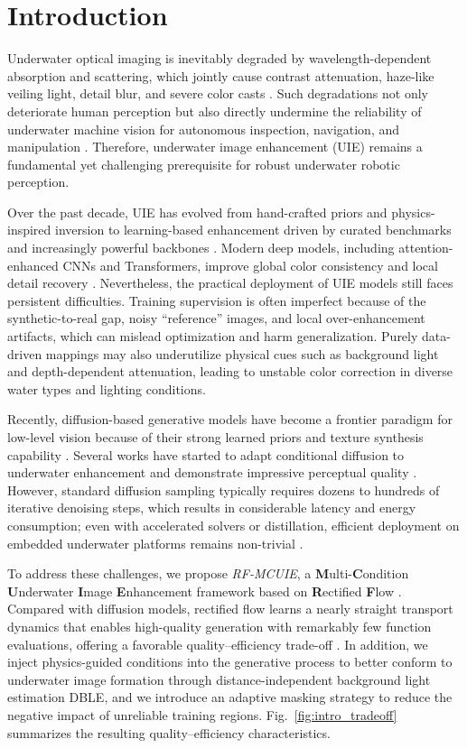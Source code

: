 \section{Introduction}
\label{sec:intro}

Underwater optical imaging is inevitably degraded by wavelength-dependent absorption and scattering, which jointly cause contrast attenuation, haze-like veiling light, detail blur, and severe color casts \cite{r1,r12}. Such degradations not only deteriorate human perception but also directly undermine the reliability of underwater machine vision for autonomous inspection, navigation, and manipulation \cite{r2,r3}. Therefore, underwater image enhancement (UIE) remains a fundamental yet challenging prerequisite for robust underwater robotic perception.

Over the past decade, UIE has evolved from hand-crafted priors and physics-inspired inversion \cite{r4,r14,r17} to learning-based enhancement driven by curated benchmarks and increasingly powerful backbones \cite{r18,r6}. Modern deep models, including attention-enhanced CNNs and Transformers, improve global color consistency and local detail recovery \cite{r0,r42,r7}. Nevertheless, the practical deployment of UIE models still faces persistent difficulties. Training supervision is often imperfect because of the synthetic-to-real gap, noisy ``reference'' images, and local over-enhancement artifacts, which can mislead optimization and harm generalization. Purely data-driven mappings may also underutilize physical cues such as background light and depth-dependent attenuation, leading to unstable color correction in diverse water types and lighting conditions.

Recently, diffusion-based generative models have become a frontier paradigm for low-level vision because of their strong learned priors and texture synthesis capability \cite{r20,r22}. Several works have started to adapt conditional diffusion to underwater enhancement and demonstrate impressive perceptual quality \cite{r9,r24,r8,r10}. However, standard diffusion sampling typically requires dozens to hundreds of iterative denoising steps, which results in considerable latency and energy consumption; even with accelerated solvers or distillation, efficient deployment on embedded underwater platforms remains non-trivial \cite{r21,r43,r45,r46}.

To address these challenges, we propose \emph{RF-MCUIE}, a \textbf{M}ulti-\textbf{C}ondition \textbf{U}nderwater \textbf{I}mage \textbf{E}nhancement framework based on \textbf{R}ectified \textbf{F}low \cite{r11}. Compared with diffusion models, rectified flow learns a nearly straight transport dynamics that enables high-quality generation with remarkably few function evaluations, offering a favorable quality--efficiency trade-off \cite{r30,r49}. In addition, we inject physics-guided conditions into the generative process to better conform to underwater image formation through distance-independent background light estimation DBLE, and we introduce an adaptive masking strategy to reduce the negative impact of unreliable training regions. Fig.~\ref{fig:intro_tradeoff} summarizes the resulting quality--efficiency characteristics.

